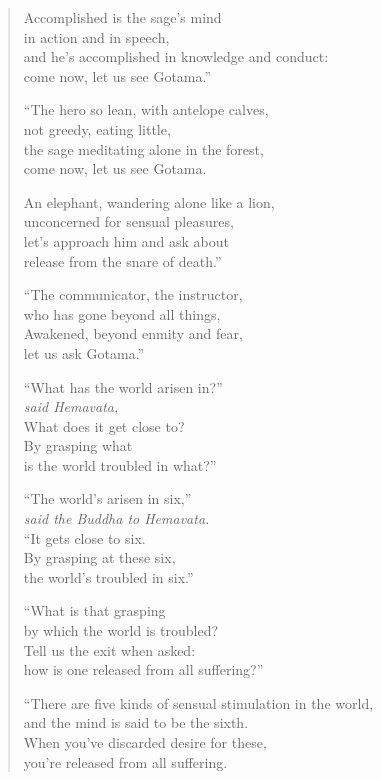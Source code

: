 \documentclass[12pt,openany]{book}%
\newcommand*{\scspeaker}[1]{\hspace{2em}\textit{#1}}
\begin{document}
\begin{verse}
Accomplished is the sage’s mind \\
in action and in speech, \\
and he’s accomplished in knowledge and conduct: \\
come now, let us see Gotama.” 

“The hero so lean, with antelope calves, \\
not greedy, eating little, \\
the sage meditating alone in the forest, \\
come now, let us see Gotama. 

An elephant, wandering alone like a lion, \\
unconcerned for sensual pleasures, \\
let’s approach him and ask about \\
release from the snare of death.” 

“The communicator, the instructor, \\
who has gone beyond all things, \\
Awakened, beyond enmity and fear, \\
let us ask Gotama.” 

“What has the world arisen in?” \\
\scspeaker{said Hemavata, }\\
What does it get close to? \\
By grasping what \\
is the world troubled in what?” 

“The world’s arisen in six,” \\
\scspeaker{said the Buddha to Hemavata. }\\
“It gets close to six. \\
By grasping at these six, \\
the world’s troubled in six.” 

“What is that grasping \\
by which the world is troubled? \\
Tell us the exit when asked: \\
how is one released from all suffering?” 

“There are five kinds of sensual stimulation in the world, \\
and the mind is said to be the sixth. \\
When you’ve discarded desire for these, \\
you’re released from all suffering. 


\end{verse}
\end{document}
